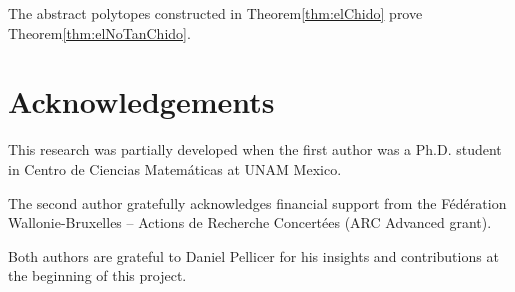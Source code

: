 \documentclass[final]{amsart}
\theoremstyle{plain}
\theoremstyle{definition}
\theoremstyle{remark}
\numberwithin{equation}{section}
\renewcommand{\{}{\lbrace}
\renewcommand{\}}{\rbrace}
\begin{document}
The abstract polytopes constructed in Theorem\nobreakspace \ref {thm:elChido} prove Theorem\nobreakspace \ref {thm:elNoTanChido}.
 
\section*{Acknowledgements}
This research was partially developed when the first author was a Ph.D. student in Centro de Ciencias Matemáticas at UNAM Mexico. 

The second author gratefully acknowledges financial support from the F\'ed\'eration Wallonie-Bruxelles -- Actions de Recherche Concert\'ees (ARC Advanced grant).

Both authors are grateful to Daniel Pellicer for his insights and contributions at the beginning of this project.

\printbibliography 
\end{document}
